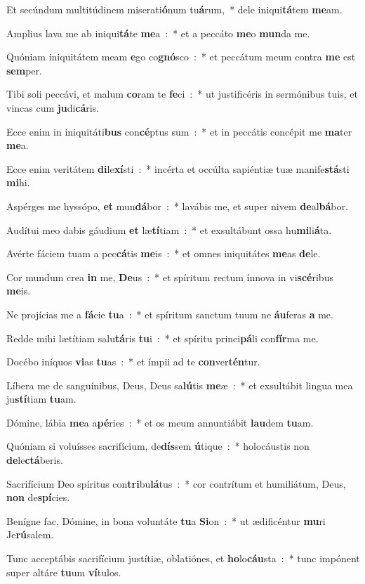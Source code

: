 ﻿\item Et secúndum multitúdinem miserati\textbf{ó}num tu\textbf{á}rum,~* dele iniqui\textbf{tá}tem \textbf{me}am.
\item Amplius lava me ab iniqui\textbf{tá}te \textbf{me}a~:~* et a peccáto \textbf{me}o \textbf{mun}da me.
\item Quóniam iniquitátem meam \textbf{e}go co\textbf{gnó}sco~:~* et peccátum meum contra \textbf{me} est \textbf{sem}per.
\item Tibi soli peccávi, et malum \textbf{co}ram te \textbf{fe}ci~:~* ut justificéris in sermónibus tuis, et vincas cum \textbf{ju}di\textbf{cá}ris.
\item Ecce enim in iniquitáti\textbf{bus} con\textbf{cé}ptus sum~:~* et in peccátis concépit me \textbf{ma}ter \textbf{me}a.
\item Ecce enim veritátem \textbf{di}le\textbf{xí}sti~:~* incérta et occúlta sapiéntiæ tuæ manife\textbf{stá}sti \textbf{mi}hi.
\item Aspérges me hyssópo, \textbf{et} mun\textbf{dá}bor~:~* lavábis me, et super nivem \textbf{de}al\textbf{bá}bor.
\item Audítui meo dabis gáudium \textbf{et} læ\textbf{tí}tiam~:~* et exsultábunt ossa hu\textbf{mi}li\textbf{á}ta.
\item Avérte fáciem tuam a pec\textbf{cá}tis \textbf{me}is~:~* et omnes iniquitátes \textbf{me}as \textbf{de}le.
\item Cor mundum crea \textbf{in} me, \textbf{De}us~:~* et spíritum rectum ínnova in vi\textbf{scé}ribus \textbf{me}is.
\item Ne projícias me a \textbf{fá}cie \textbf{tu}a~:~* et spíritum sanctum tuum ne \textbf{áu}feras \textbf{a} me.
\item Redde mihi lætítiam salu\textbf{tá}ris \textbf{tu}i~:~* et spíritu princi\textbf{pá}li con\textbf{fír}ma me.
\item Docébo iníquos \textbf{vi}as \textbf{tu}as~:~* et ímpii ad te \textbf{con}ver\textbf{tén}tur.
\item Líbera me de sanguínibus, Deus, Deus sa\textbf{lú}tis \textbf{me}æ~:~* et exsultábit lingua mea ju\textbf{stí}tiam \textbf{tu}am.
\item Dómine, lábia \textbf{me}a a\textbf{pé}ries~:~* et os meum annuntiábit \textbf{lau}dem \textbf{tu}am.
\item Quóniam si voluísses sacrifícium, de\textbf{dís}sem \textbf{ú}tique~:~* holocáustis non \textbf{de}le\textbf{ctá}beris.
\item Sacrifícium Deo spíritus con\textbf{tri}bu\textbf{lá}tus~:~* cor contrítum et humiliátum, Deus, \textbf{non} de\textbf{spí}cies.
\item Benígne fac, Dómine, in bona voluntáte \textbf{tu}a \textbf{Si}on~:~* ut ædificéntur \textbf{mu}ri Je\textbf{rú}salem.
\item Tunc acceptábis sacrifícium justítiæ, oblatiónes, et \textbf{ho}lo\textbf{cáu}sta~:~* tunc impónent super altáre \textbf{tu}um \textbf{ví}tulos.